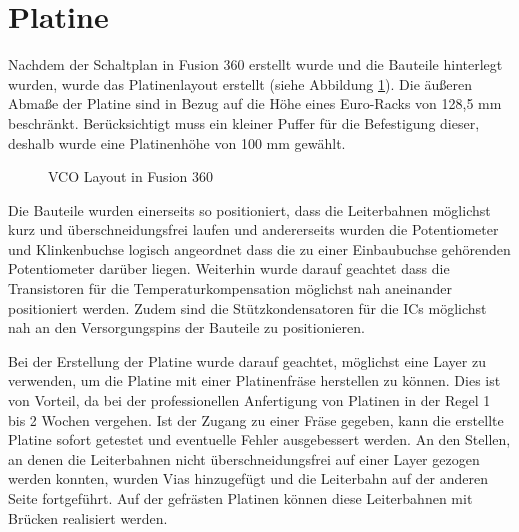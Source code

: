\newpage

\section{Platine}
Nachdem der Schaltplan in Fusion 360 erstellt wurde und die Bauteile hinterlegt wurden, wurde das Platinenlayout erstellt (siehe Abbildung \ref{fig:VCO Layout}).
Die äußeren Abmaße der Platine sind in Bezug auf die Höhe eines Euro-Racks von 128,5 mm beschränkt. 
Berücksichtigt muss ein kleiner Puffer für die Befestigung dieser, deshalb wurde eine Platinenhöhe von 100 mm gewählt.

\begin{figure}[h]
	\centering
	\setlength{\fboxsep}{1pt} %
	\setlength{\fboxrule}{1pt} %
	\caption{VCO Layout in Fusion 360}
	\label{fig:VCO Layout}
\end{figure}

Die Bauteile wurden einerseits so positioniert, dass die Leiterbahnen möglichst kurz und überschneidungsfrei laufen und andererseits wurden die Potentiometer und Klinkenbuchse logisch angeordnet dass die zu einer Einbaubuchse gehörenden Potentiometer darüber liegen.
Weiterhin wurde darauf geachtet dass die Transistoren für die Temperaturkompensation möglichst nah aneinander positioniert werden.
Zudem sind die Stützkondensatoren für die ICs möglichst nah an den Versorgungspins der Bauteile zu positionieren.

Bei der Erstellung der Platine wurde darauf geachtet, möglichst eine Layer zu verwenden, um die Platine mit einer Platinenfräse herstellen zu können.
Dies ist von Vorteil, da bei der professionellen Anfertigung von Platinen in der Regel 1 bis 2 Wochen vergehen.
Ist der Zugang zu einer Fräse gegeben, kann die erstellte Platine sofort getestet und eventuelle Fehler ausgebessert werden.
An den Stellen, an denen die Leiterbahnen nicht überschneidungsfrei auf einer Layer gezogen werden konnten, wurden Vias hinzugefügt und die Leiterbahn auf der anderen Seite fortgeführt.
Auf der gefrästen Platinen können diese Leiterbahnen mit Brücken realisiert werden.

